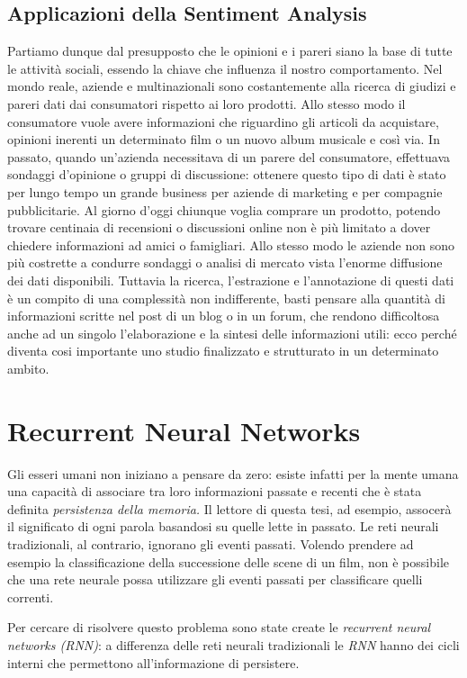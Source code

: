 \documentclass[a4paper,12pt,openright,twoside]{report}
\theoremstyle{definition}
\begin{document}
\subsection{Applicazioni della Sentiment Analysis}
Partiamo dunque dal presupposto che le opinioni e i pareri siano la base di tutte le attività sociali,
 essendo la chiave che influenza il nostro comportamento. Nel mondo reale, aziende e multinazionali 
 sono costantemente alla ricerca di giudizi e pareri dati dai consumatori  rispetto ai loro prodotti. 
 Allo stesso modo il consumatore vuole avere informazioni che riguardino gli articoli da acquistare, 
 opinioni inerenti un determinato film o un nuovo album musicale e così via. In passato, quando un’azienda 
 necessitava di un parere del consumatore, effettuava sondaggi d’opinione o gruppi di discussione: 
 ottenere questo tipo di dati è stato per lungo tempo un grande business per aziende di marketing e 
 per compagnie pubblicitarie.
Al giorno d’oggi chiunque voglia comprare un prodotto, potendo trovare centinaia di recensioni o 
discussioni online non è più limitato a dover chiedere informazioni ad amici o famigliari. 
Allo stesso modo le aziende non sono più costrette a condurre sondaggi o analisi di mercato vista 
l’enorme diffusione dei dati disponibili. Tuttavia la ricerca, l’estrazione e l’annotazione di questi 
dati è un compito di una complessità non indifferente, basti pensare alla quantità di informazioni 
scritte nel post di un blog o in un forum, che rendono difficoltosa anche ad un singolo l'elaborazione 
e la sintesi delle informazioni utili: ecco perché diventa cosi importante uno studio finalizzato e 
strutturato in un determinato ambito.


\section{Recurrent Neural Networks}
Gli esseri umani non iniziano a pensare da zero: esiste infatti per la mente umana una capacità di 
associare tra loro informazioni passate e recenti che è stata definita \emph{persistenza della memoria.} 
Il lettore di questa tesi, ad esempio, assocerà il significato di ogni parola basandosi su quelle 
lette in passato.
Le reti neurali tradizionali, al contrario, ignorano gli eventi passati. Volendo prendere ad esempio 
la classificazione della successione delle scene di un film, non è possibile che una rete neurale 
possa utilizzare gli eventi passati per classificare quelli correnti.

Per cercare di risolvere questo problema sono state create le \emph{recurrent neural networks (RNN)}:
a differenza delle reti neurali tradizionali le \emph{RNN} hanno dei cicli interni che permettono
all'informazione di persistere.
\end{document}
